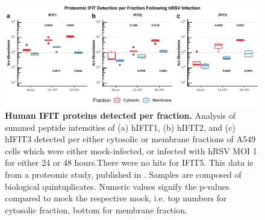 \begin{figure}
    \centering
    \includegraphics[width=1\linewidth]{06. Chapter 1/Figs/01. Induction/13. merged_proteomics.pdf}
    \caption[Human IFIT proteins detected per fraction.]{\textbf{Human IFIT proteins detected per fraction.} Analysis of summed peptide intensities of (a) hIFIT1, (b) hIFIT2, and (c) hIFIT3 detected per either cytosolic or membrane fractions of A549 cells which were either mock-infected, or infected with hRSV MOI 1 for either 24 or 48 hours.There were no hits for IFIT5. This data is from a proteomic study, published in \cite{Jobe2023ViralCondensates}. Samples are composed of biological quintuplicates. Numeric values signify the p-values compared to mock the respective mock, i.e. top numbers for cytosolic fraction, bottom for membrane fraction.}
    \label{Human IFIT proteomics.}
\end{figure}

